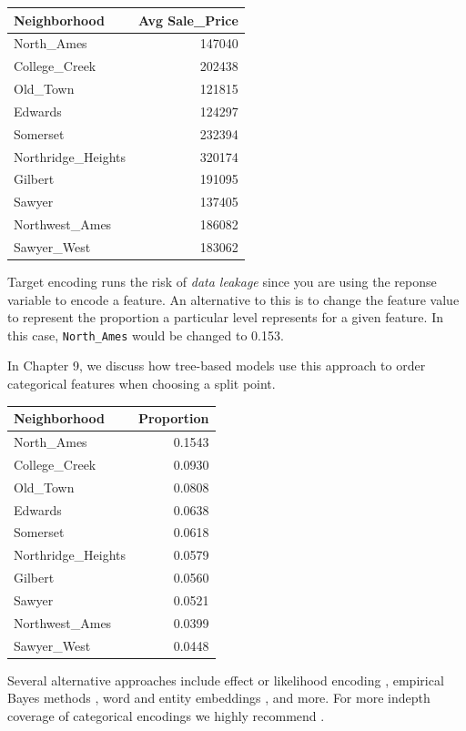 \documentclass[]{krantz}
\makeatletter
\newenvironment{kframe}{%
\medskip{}
\setlength{\fboxsep}{.8em}
 \def\at@end@of@kframe{}%
 \ifinner\ifhmode%
  \def\at@end@of@kframe{\end{minipage}}%
  \begin{minipage}{\columnwidth}%
 \fi\fi%
 \def\FrameCommand##1{\hskip\@totalleftmargin \hskip-\fboxsep
 \colorbox{shadecolor}{##1}\hskip-\fboxsep
     \hskip-\linewidth \hskip-\@totalleftmargin \hskip\columnwidth}%
 \MakeFramed {\advance\hsize-\width
   \@totalleftmargin\z@ \linewidth\hsize
   \@setminipage}}%
 {\par\unskip\endMakeFramed%
 \at@end@of@kframe}
\newenvironment{block}[1]
  {
  \begin{itemize}
  \renewcommand{\labelitemi}{
    \raisebox{-.7\height}[0pt][0pt]{
      {\setkeys{Gin}{width=3em,keepaspectratio}\texttt{[image: icons/\#1]}}
    }
  }
  \setlength{\fboxsep}{1em}
  \begin{kframe}
  \item
  }
  {
  \end{kframe}
  \end{itemize}
  }
\newenvironment{note}
  {\begin{block}{note}}
  {\end{block}}
\makeatother
\begin{document}
\begin{tabular}{l|r}
\hline
Neighborhood & Avg Sale\_Price\\
\hline
North\_Ames & 147040\\
\hline
College\_Creek & 202438\\
\hline
Old\_Town & 121815\\
\hline
Edwards & 124297\\
\hline
Somerset & 232394\\
\hline
Northridge\_Heights & 320174\\
\hline
Gilbert & 191095\\
\hline
Sawyer & 137405\\
\hline
Northwest\_Ames & 186082\\
\hline
Sawyer\_West & 183062\\
\hline
\end{tabular}

Target encoding runs the risk of \emph{data leakage} since you are using the reponse variable to encode a feature. An alternative to this is to change the feature value to represent the proportion a particular level represents for a given feature. In this case, \texttt{North\_Ames} would be changed to 0.153.

\begin{note}
In Chapter 9, we discuss how tree-based models use this approach to
order categorical features when choosing a split point.
\end{note}

\begin{tabular}{l|r}
\hline
Neighborhood & Proportion\\
\hline
North\_Ames & 0.1543\\
\hline
College\_Creek & 0.0930\\
\hline
Old\_Town & 0.0808\\
\hline
Edwards & 0.0638\\
\hline
Somerset & 0.0618\\
\hline
Northridge\_Heights & 0.0579\\
\hline
Gilbert & 0.0560\\
\hline
Sawyer & 0.0521\\
\hline
Northwest\_Ames & 0.0399\\
\hline
Sawyer\_West & 0.0448\\
\hline
\end{tabular}

Several alternative approaches include effect or likelihood encoding \citep{micci2001preprocessing, zumel2016vtreat}, empirical Bayes methods \citep{west2014linear}, word and entity embeddings \citep{guo2016entity, chollet2018deep}, and more. For more indepth coverage of categorical encodings we highly recommend \citet{kuhn2019feature}.
\end{document}
